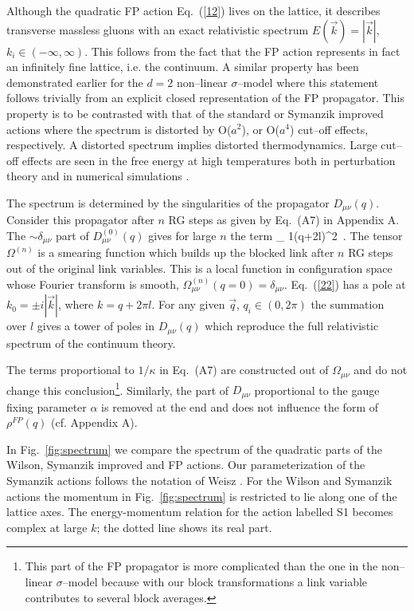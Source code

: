 Although the quadratic FP action Eq.~(\ref{12}) lives on the lattice,
it describes transverse massless gluons with an exact relativistic
spectrum $E(\vec{k})=|\vec{k}|$, $k_i \in (-\infty,\infty)$.
This follows from the fact that the FP action represents in fact
an infinitely fine lattice, i.e. the continuum.
A similar property has been demonstrated earlier for the $d=2$
 non--linear $\sigma$--model \cite{HN} where this statement follows
trivially from an explicit closed representation of the FP propagator.
This property is to be contrasted with that of the standard or
Symanzik improved actions where the spectrum is distorted
by O($a^2$), or O($a^4$) cut--off effects, respectively.
A distorted spectrum implies distorted thermodynamics.
Large cut--off effects are seen in the free energy at high
temperatures both in perturbation theory and in numerical simulations 
\cite{CUTOFF}.

The spectrum is determined by the singularities of the propagator
$D_{\mu \nu}(q)$. Consider this propagator after $n$ RG steps
as given by Eq.~(A7) in Appendix A.
The $\sim \delta_{\mu \nu}$
part of $D^{(0)}_{\mu \nu}(q)$ gives
for large $n$ the term
\bee
{}_{\mu \nu}
{1\over (q+2\pi l)^2} \,.                             \label{22}
\ee
The tensor $\Omega^{(n)}$ is a smearing function which builds up
the blocked link after $n$ RG steps out of the original link
variables. This is a local function in configuration space whose
Fourier transform is smooth, $\Omega^{(n)}_{\mu \nu}(q=0)=\delta_{\mu \nu}$.
Eq.~(\ref{22}) has a pole at $k_0= \pm i |\vec{k}|$, where
$k=q+2 \pi l$. For any given $\vec{q}$, $q_i\in (0,2\pi)$ the summation
over $l$ gives a tower of poles in $D_{\mu \nu}(q)$ which reproduce
the full relativistic spectrum of the continuum theory.

The terms proportional to $1/\kappa$ in Eq.~(A7) are constructed out of
$\Omega_{\mu \nu}$ and do not change this conclusion\footnote{This part of the
FP propagator is more complicated than the one in the non--linear
$\sigma$--model because with our block transformations a link
variable contributes to several block averages.}.
Similarly, the part of $D_{\mu \nu}$ proportional to the gauge fixing
parameter $\alpha$ is removed at the end and does not influence
the form of $\rho^{FP}(q)$ (cf. Appendix A).

In Fig.~\ref{fig:spectrum} we compare the spectrum of the quadratic parts of
the Wilson, Symanzik improved and FP actions.
Our parameterization of the Symanzik actions follows the notation of
Weisz \cite{WEISZ}. For the Wilson and Symanzik actions the momentum in 
Fig.~\ref{fig:spectrum} is restricted to lie along one of the lattice
axes. The energy-momentum relation for the action labelled S1 becomes
complex at large $k$; the dotted line shows its real part.

